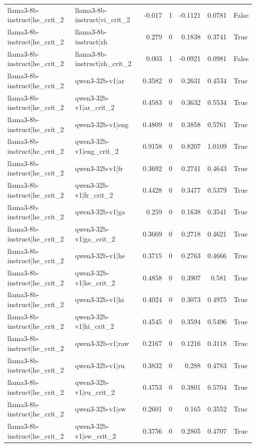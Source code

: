 \begin{table}
\begin{tabular}{l l r r r r l}
llama3-8b-instruct|he_crit_2 & llama3-8b-instruct|vi_crit_2 & -0.017 & 1 & -0.1121 & 0.0781 & False \\
llama3-8b-instruct|he_crit_2 & llama3-8b-instruct|zh & 0.279 & 0 & 0.1838 & 0.3741 & True \\
llama3-8b-instruct|he_crit_2 & llama3-8b-instruct|zh_crit_2 & 0.003 & 1 & -0.0921 & 0.0981 & False \\
llama3-8b-instruct|he_crit_2 & qwen3-32b-v1|ar & 0.3582 & 0 & 0.2631 & 0.4534 & True \\
llama3-8b-instruct|he_crit_2 & qwen3-32b-v1|ar_crit_2 & 0.4583 & 0 & 0.3632 & 0.5534 & True \\
llama3-8b-instruct|he_crit_2 & qwen3-32b-v1|eng & 0.4809 & 0 & 0.3858 & 0.5761 & True \\
llama3-8b-instruct|he_crit_2 & qwen3-32b-v1|eng_crit_2 & 0.9158 & 0 & 0.8207 & 1.0109 & True \\
llama3-8b-instruct|he_crit_2 & qwen3-32b-v1|fr & 0.3692 & 0 & 0.2741 & 0.4643 & True \\
llama3-8b-instruct|he_crit_2 & qwen3-32b-v1|fr_crit_2 & 0.4428 & 0 & 0.3477 & 0.5379 & True \\
llama3-8b-instruct|he_crit_2 & qwen3-32b-v1|ga & 0.259 & 0 & 0.1638 & 0.3541 & True \\
llama3-8b-instruct|he_crit_2 & qwen3-32b-v1|ga_crit_2 & 0.3669 & 0 & 0.2718 & 0.4621 & True \\
llama3-8b-instruct|he_crit_2 & qwen3-32b-v1|he & 0.3715 & 0 & 0.2763 & 0.4666 & True \\
llama3-8b-instruct|he_crit_2 & qwen3-32b-v1|he_crit_2 & 0.4858 & 0 & 0.3907 & 0.581 & True \\
llama3-8b-instruct|he_crit_2 & qwen3-32b-v1|hi & 0.4024 & 0 & 0.3073 & 0.4975 & True \\
llama3-8b-instruct|he_crit_2 & qwen3-32b-v1|hi_crit_2 & 0.4545 & 0 & 0.3594 & 0.5496 & True \\
llama3-8b-instruct|he_crit_2 & qwen3-32b-v1|raw & 0.2167 & 0 & 0.1216 & 0.3118 & True \\
llama3-8b-instruct|he_crit_2 & qwen3-32b-v1|ru & 0.3832 & 0 & 0.288 & 0.4783 & True \\
llama3-8b-instruct|he_crit_2 & qwen3-32b-v1|ru_crit_2 & 0.4753 & 0 & 0.3801 & 0.5704 & True \\
llama3-8b-instruct|he_crit_2 & qwen3-32b-v1|sw & 0.2601 & 0 & 0.165 & 0.3552 & True \\
llama3-8b-instruct|he_crit_2 & qwen3-32b-v1|sw_crit_2 & 0.3756 & 0 & 0.2805 & 0.4707 & True \\

\end{tabular}
\end{table}
